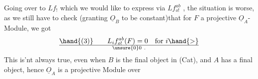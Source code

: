 Going over to $Lf_!$ which we would like to express via $Lf^{ab}_{o!}$ , the
situation is worse, as we still have to check (granting 
$\underline{O}_B$ to be constant)that for $F$ a projective $\underline{O}_A$-Module, we got
\[ \hand{(3)} \qquad L_i f^{ab}_{o!}(F)=0 \quad \text{for } i \hand{>} \over{\unsure{0}}{0} \ . \]
This is'nt always true, even when $B$ is the final object in (Cat),
and $A$ has a final object, hence $\underline{O}_A$ is a projective Module over


